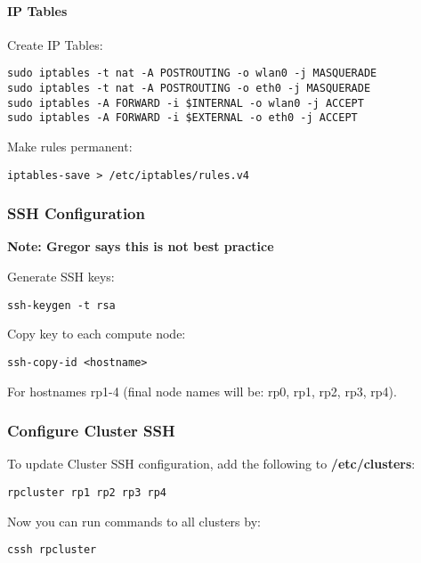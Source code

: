 \paragraph{IP Tables}

Create IP Tables:

\begin{lstlisting}
sudo iptables -t nat -A POSTROUTING -o wlan0 -j MASQUERADE
sudo iptables -t nat -A POSTROUTING -o eth0 -j MASQUERADE
sudo iptables -A FORWARD -i $INTERNAL -o wlan0 -j ACCEPT
sudo iptables -A FORWARD -i $EXTERNAL -o eth0 -j ACCEPT
\end{lstlisting}

Make rules permanent:

\begin{lstlisting}
iptables-save > /etc/iptables/rules.v4
\end{lstlisting}

\subsubsection{SSH Configuration}

\textbf{Note: Gregor says this is not best practice}

Generate SSH keys:

\begin{lstlisting}
ssh-keygen -t rsa
\end{lstlisting}

Copy key to each compute node:

\begin{lstlisting}
ssh-copy-id <hostname>
\end{lstlisting}

For hostnames rp1-4 (final node names will be: rp0, rp1, rp2, rp3, rp4).

\subsubsection{Configure Cluster SSH}

To update Cluster SSH configuration, add the following to
\textbf{/etc/clusters}:

\begin{lstlisting}
rpcluster rp1 rp2 rp3 rp4
\end{lstlisting}

Now you can run commands to all clusters by:

\begin{lstlisting}
cssh rpcluster
\end{lstlisting}

